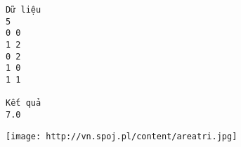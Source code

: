 \begin{verbatim}
Dữ liệu
5
0 0
1 2
0 2
1 0
1 1

Kết quả
7.0
\end{verbatim}
\texttt{[image: http://vn.spoj.pl/content/areatri.jpg]}